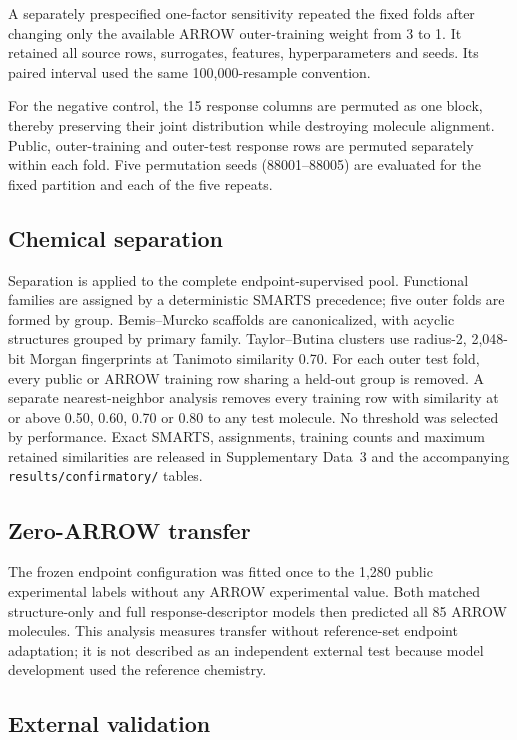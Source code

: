 \documentclass[12pt]{article}
\begin{document}
A separately prespecified one-factor sensitivity repeated the fixed folds after changing
only the available ARROW outer-training weight from 3 to 1. It retained all source
rows, surrogates, features, hyperparameters and seeds. Its paired interval used the same
100,000-resample convention.

For the negative control, the 15 response columns are permuted as one block, thereby
preserving their joint distribution while destroying molecule alignment. Public,
outer-training and outer-test response rows are permuted separately within each fold.
Five permutation seeds (88001--88005) are evaluated for the fixed partition and each
of the five repeats.

\subsection*{Chemical separation}

Separation is applied to the complete endpoint-supervised pool. Functional families
are assigned by a deterministic SMARTS precedence; five outer folds are formed by
group. Bemis--Murcko scaffolds are canonicalized, with acyclic structures grouped by
primary family. Taylor--Butina clusters use radius-2, 2,048-bit Morgan fingerprints
at Tanimoto similarity 0.70. For each outer test fold, every public or ARROW training
row sharing a held-out group is removed. A separate nearest-neighbor analysis removes
every training row with similarity at or above 0.50, 0.60, 0.70 or 0.80 to any test
molecule. No threshold was selected by performance. Exact SMARTS, assignments,
training counts and maximum retained similarities are released in Supplementary
Data~3 and the accompanying \nolinkurl{results/confirmatory/} tables.

\subsection*{Zero-ARROW transfer}

The frozen endpoint configuration was fitted once to the 1,280 public experimental
labels without any ARROW experimental value. Both matched structure-only and full
response-descriptor models then predicted all 85 ARROW molecules. This analysis measures
transfer without reference-set endpoint adaptation; it is not described as an
independent external test because model development used the reference chemistry.

\subsection*{External validation}
\end{document}
